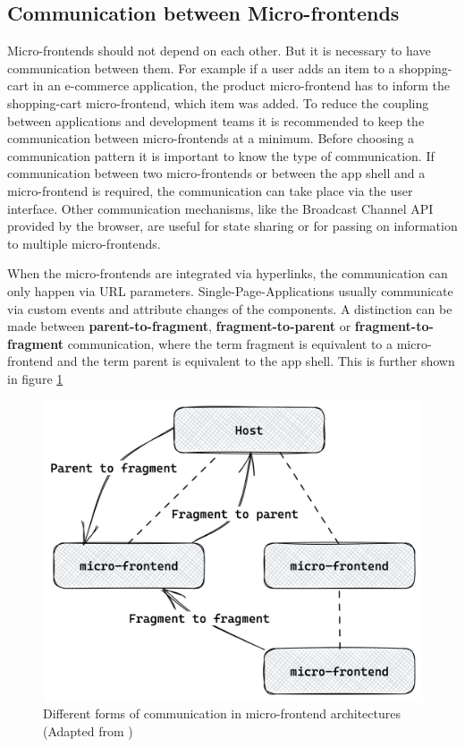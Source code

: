 \subsection{Communication between Micro-frontends}\label{subsection:background:micro-frontend:communication-patterns}

Micro-frontends should not depend on each other. But it is necessary to have communication between them. For example if a user adds an item to a shopping-cart in an e-commerce application, the product micro-frontend has to inform the shopping-cart micro-frontend, which item was added. To reduce the coupling between applications and development teams it is recommended to keep the communication between micro-frontends at a minimum. Before choosing a communication pattern it is important to know the type of communication. If communication between two micro-frontends or between the app shell and a micro-frontend is required, the communication can take place via the user interface. Other communication mechanisms, like the Broadcast Channel API provided by the browser, are useful for state sharing or for passing on information to multiple micro-frontends. \cite{book:2020:geers:background:micro-frontends:micro-frontends-in-action}

\bigskip

\noindent When the micro-frontends are integrated via hyperlinks, the communication can only happen via URL parameters. Single-Page-Applications usually communicate via custom events and attribute changes of the components. \cite[100]{book:2020:geers:background:micro-frontends:micro-frontends-in-action} \cite[315-316]{book:2019:farrell:background:micro-frontends:web-components-in-action} A distinction can be made between \textbf{parent-to-fragment}, \textbf{fragment-to-parent} or \textbf{fragment-to-fragment} communication, where the term fragment is equivalent to a micro-frontend and the term parent is equivalent to the app shell. \cite{book:2020:geers:background:micro-frontends:micro-frontends-in-action} This is further shown in figure \ref{fig:background:micro-frontend:communication:communication-patterns}

\ifshowImages
\begin{figure}[H]
    \centering
    \includegraphics[width=0.5\linewidth]{images/background/communication/communication-patterns.png}
    \caption{Different forms of communication in micro-frontend architectures (Adapted from \cite[100]{book:2020:geers:background:micro-frontends:micro-frontends-in-action})}\label{fig:background:micro-frontend:communication:communication-patterns}
\end{figure}
\fi

